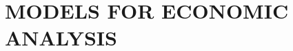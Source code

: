 \chapter{MODELS FOR ECONOMIC ANALYSIS}\label{chap:12}


\begin{exercises}
    \begin{exercise}
    \label{sea-12-1}
    
    \end{exercise}
    \begin{solution}
    \end{solution}

\end{exercises}
